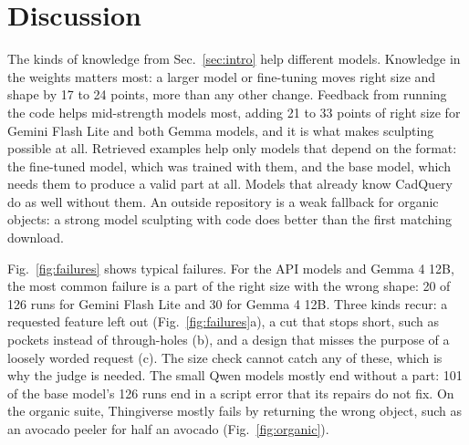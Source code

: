 \section{Discussion}
\label{sec:discussion}


The kinds of knowledge from Sec.~\ref{sec:intro} help different models.
Knowledge in the weights matters most: a larger model or fine-tuning moves right size and shape by 17 to 24 points, more than any other change.
Feedback from running the code helps mid-strength models most, adding 21 to 33 points of right size for Gemini Flash Lite and both Gemma models, and it is what makes sculpting possible at all.
Retrieved examples help only models that depend on the format: the fine-tuned model, which was trained with them, and the base model, which needs them to produce a valid part at all.
Models that already know CadQuery do as well without them.
An outside repository is a weak fallback for organic objects: a strong model sculpting with code does better than the first matching download.

Fig.~\ref{fig:failures} shows typical failures.
For the API models and Gemma 4 12B, the most common failure is a part of the right size with the wrong shape: 20 of 126 runs for Gemini Flash Lite and 30 for Gemma 4 12B.
Three kinds recur: a requested feature left out (Fig.~\ref{fig:failures}a), a cut that stops short, such as pockets instead of through-holes (b), and a design that misses the purpose of a loosely worded request (c).
The size check cannot catch any of these, which is why the judge is needed.
The small Qwen models mostly end without a part: 101 of the base model's 126 runs end in a script error that its repairs do not fix.
On the organic suite, Thingiverse mostly fails by returning the wrong object, such as an avocado peeler for half an avocado (Fig.~\ref{fig:organic}).


